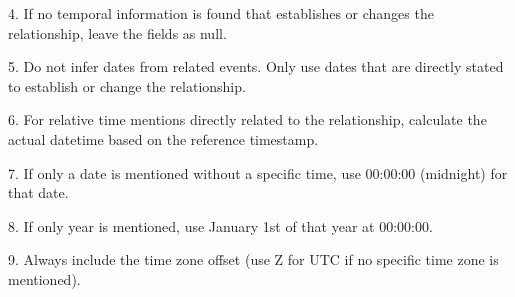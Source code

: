 \documentclass{article}
\begin{document}
{{         4. If no temporal information is found that establishes or changes the 
         relationship, leave the fields as null.

         5. Do not infer dates from related events. Only use dates that are 
         directly stated to establish or change the relationship.

6. For relative time mentions directly related to the relationship, calculate the
actual datetime based on the reference timestamp.

         7. If only a date is mentioned without a specific time, use 00:00:00 (midnight) for that date.

         8. If only year is mentioned, use January 1st of that year at 00:00:00.

         9. Always include the time zone offset (use Z for UTC if no specific 
         time zone is mentioned).

    }%
}


  
  
\end{document}
